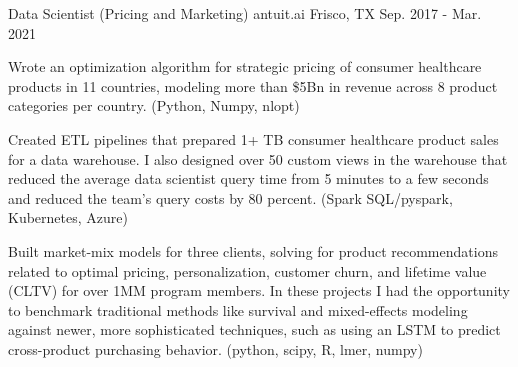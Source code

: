 \begin{cventries}
  \cventry
    {Data Scientist (Pricing and Marketing)} %
    {antuit.ai} %
    {Frisco, TX} %
    {Sep. 2017 - Mar. 2021} %
    {
      \begin{cvitems} %
      \item {
          Wrote an optimization algorithm for strategic pricing of consumer
          healthcare products in 11 countries, modeling more than \$5Bn in
          revenue across 8 product categories per country.
          (Python, Numpy, nlopt)
      }
      \item {
          Created ETL pipelines that prepared 1+ TB consumer healthcare
          product sales for a data warehouse.   I also designed over 50 custom
          views in the warehouse that reduced the average data scientist query
          time from 5 minutes to a few seconds and reduced the team's query
          costs by 80 percent. (Spark SQL/pyspark, Kubernetes, Azure)
      }
      \item {
          Built market-mix models for three clients, solving for product
          recommendations related to optimal pricing, personalization, customer
          churn, and lifetime value (CLTV) for over 1MM program members.  In
          these projects I had the opportunity to benchmark traditional methods
          like survival and mixed-effects modeling against newer, more
          sophisticated techniques, such as using an LSTM to predict
          cross-product purchasing behavior. (python, scipy, R, lmer, numpy)
      }
      \end{cvitems}
    }

\end{cventries}
